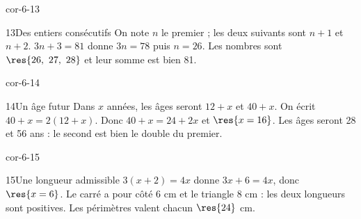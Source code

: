 \begin{blocLivre}{cor-6-13}\begin{corrige}{13}{Des entiers consécutifs}
On note $n$ le premier ; les deux suivants sont $n+1$ et $n+2$. $3n+3=81$ donne $3n=78$ puis $n=26$. Les nombres sont $\res{26,\ 27,\ 28}$ et leur somme est bien 81.
\end{corrige}\end{blocLivre}
\begin{blocLivre}{cor-6-14}\begin{corrige}{14}{Un âge futur}
Dans $x$ années, les âges seront $12+x$ et $40+x$. On écrit $40+x=2(12+x)$. Donc $40+x=24+2x$ et $\res{x=16}$. Les âges seront 28 et 56 ans : le second est bien le double du premier.
\end{corrige}\end{blocLivre}
\begin{blocLivre}{cor-6-15}\begin{corrige}{15}{Une longueur admissible}
$3(x+2)=4x$ donne $3x+6=4x$, donc $\res{x=6}$. Le carré a pour côté 6 cm et le triangle 8 cm : les deux longueurs sont positives. Les périmètres valent chacun $\res{24}$ cm.
\label{fig-cor-6-15}
\end{corrige}\end{blocLivre}
